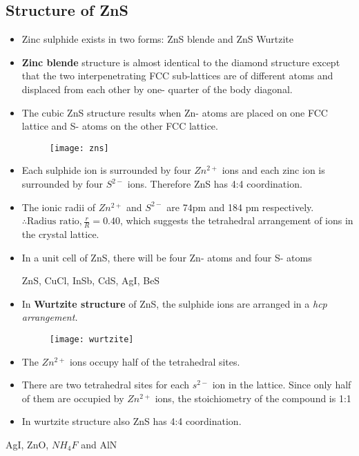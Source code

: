 \subsection{Structure of ZnS}
\begin{itemize}
	\item Zinc sulphide exists in two forms: ZnS blende and ZnS Wurtzite
	\item\textbf{ Zinc blende} structure is almost identical to the diamond structure except that the two interpenetrating  FCC sub-lattices are of different atoms and displaced from each other by one- quarter of the body diagonal.
	\item The cubic ZnS structure results when Zn- atoms are placed on one FCC lattice and S- atoms on the other FCC lattice.\\
	\begin{figure}[h]
		\texttt{[image: zns]}
	\end{figure}
	\item Each sulphide ion is surrounded by four $Zn^{2+}$ ions and each zinc ion is surrounded by four $S^{2-}$ ions. Therefore ZnS has 4:4 coordination.
	\item The ionic radii of $Zn^{2+}$ and $S^{2-}$ are 74pm and 184 pm respectively.\\
	$\therefore \text{Radius ratio}, \frac{r}{R}= 0.40$, which suggests the tetrahedral arrangement of ions in the crystal lattice.
	\item In a unit cell of ZnS, there will be four Zn- atoms and four S- atoms
	\begin{example}
		ZnS, CuCl, InSb, CdS, AgI, BeS
	\end{example}
	\item In\textbf{ Wurtzite structure} of ZnS, the sulphide ions are arranged in a \textit{hcp arrangement.}
	\begin{figure}[h]
		\texttt{[image: wurtzite]}
	\end{figure}
	\item The $Zn^{2+}$ ions occupy half of the tetrahedral sites.
	\item There are two tetrahedral sites for each $s^{2-}$ ion in the lattice. Since only half of them are occupied by $Zn^{2+}$ ions, the stoichiometry of the compound is 1:1
	\item  In wurtzite structure also ZnS has 4:4 coordination.
\end{itemize}
\begin{example}
	AgI, ZnO, $NH_{4}F$ and AlN
\end{example}
